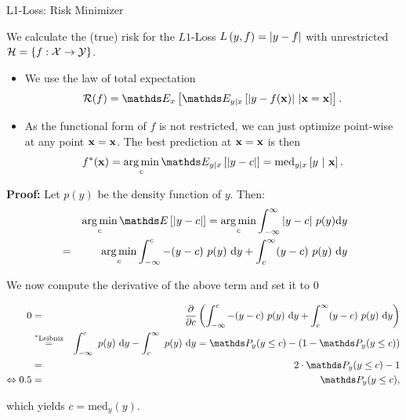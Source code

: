 \documentclass[11pt,compress,t,notes=noshow, xcolor=table]{beamer}
\begin{document}
\begin{vbframe}{L1-Loss: Risk Minimizer}

We calculate the (true) risk for the $L1$-Loss $L\left(y, f\right) = \left|y-f\right|$ with unrestricted $\mathcal{H} = \{f: \mathcal{X} \to \mathcal{Y}\}$. 

\vspace{0.5cm}

\begin{itemize}
  \setlength{\itemsep}{1.4em}  
  \item We use the law of total expectation
  \vspace{0.3cm}
  $$
    \riskf = \E_x \left[\E_{y|x}\left[|y-\fx|~|\xv = \xv\right]\right]. 
  $$
  \item As the functional form of $f$ is not restricted, we can just optimize point-wise at any point $\mathbf{x} = \mathbf{x}$. The best prediction at $\mathbf{x} = \mathbf{x}$ is then 
  \vspace{0.3cm}  
  $$
    f^{\ast}(\xv) = \argmin_c \E_{y|x}\left[|y - c|\right]= \text{med}_{y|x} \left[y ~|~ \xv \right]. 
  $$

\end{itemize}

  \framebreak 

\begin{footnotesize}
\textbf{Proof:} Let $p(y)$ be the density function of $y$. Then: 
  \begin{eqnarray*}
  && \argmin_c \E\left[|y - c|\right] = \argmin_c \int_{-\infty}^\infty |y - c| ~ p(y) \text{d}y \\
  &=& \argmin_c \int_{-\infty}^c -(y - c)~p(y)~\text{d}y + \int_c^\infty (y - c)~p(y)~\text{d}y 
  \end{eqnarray*}

We now compute the derivative of the above term and set it to $0$

\begin{eqnarray*}
0 &=& \frac{\partial}{\partial c} \left(\int_{-\infty}^c -(y - c)~p(y)~\text{d}y + \int_c^\infty (y - c)~p(y)~\text{d}y\right) \\ &\overset{^\ast\text{Leibniz}}{=}& \int_{-\infty}^c  ~p(y)~\text{d}y - \int_c^\infty ~p(y)~\text{d}y =   \P_y (y \le c) - \left(1 - \P_y (y \le c)\right) \\
&=& 2 \cdot \P_y (y \le c) - 1 \\
\Leftrightarrow 0.5 &=& \P_y (y \le c),
\end{eqnarray*}

which yields $c = \text{med}_y(y)$. 


\end{footnotesize}
\end{vbframe}
\end{document}
